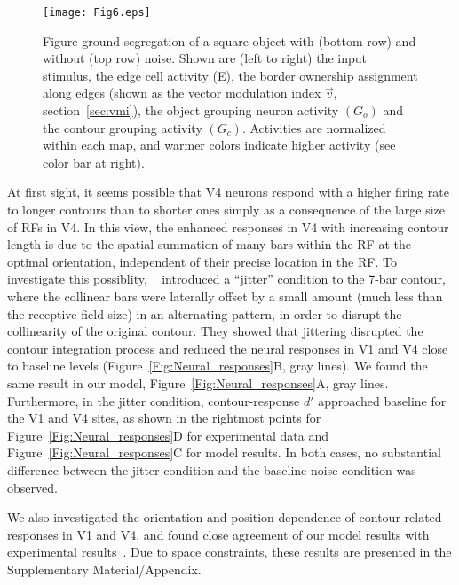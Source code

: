 {\begin{figure}
\begin{center}
\texttt{[image: Fig6.eps]}
\end{center}
\caption{Figure-ground segregation of a square object with (bottom
  row) and without (top row) noise. Shown are (left to right) the input
  stimulus, the edge cell activity (E), the border ownership
  assignment along edges (shown as the vector modulation index $\vec{v}$,
  section~\ref{sec:vmi}), the object grouping 
  neuron activity 
$(G_o)$
 and the contour grouping activity
$(G_c)$.
 Activities are normalized within each map, and warmer colors
  indicate higher activity (see color bar at right).}
\label{Fig:Square}
\end{figure}

At first sight, it seems possible that 
V4 neurons respond with a higher firing rate to longer contours than
to shorter ones simply as a consequence of 
the large size of RFs in V4. 
In this view, the enhanced responses in V4 with increasing contour
length is due to the spatial summation of many bars
within the RF at the optimal orientation,
independent of their precise location in the RF. 
To  investigate this possiblity,
~\cite{Chen_etal14} introduced a ``jitter'' condition to the 7-bar
contour, where the collinear bars were laterally offset 
by a small amount (much less than the receptive field size)
in an alternating pattern, in order to disrupt the collinearity of the original contour. They showed that jittering disrupted the
contour integration process and reduced the neural responses in V1
and V4 close to baseline levels (Figure~\ref{Fig:Neural_responses}B,
gray lines). We found the same result in our model,
Figure~\ref{Fig:Neural_responses}A, gray lines.  Furthermore, in the
jitter condition, contour-response $d'$ approached baseline for the
V1 and V4 sites, as shown in the rightmost points for
Figure~\ref{Fig:Neural_responses}D for experimental data and
Figure~\ref{Fig:Neural_responses}C for model results. In both cases,
no substantial difference between the jitter condition and the
baseline noise condition was observed.

We also investigated the orientation and position dependence of contour-related responses in V1 and V4, and found close agreement of our model results with experimental results~\citep{Chen_etal14}. Due to space constraints, these results are presented in the Supplementary Material/Appendix. %

}
